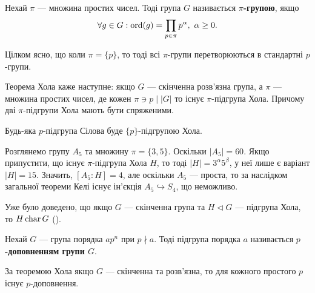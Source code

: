 \documentclass{math_library}
\begin{document}
\begin{definition}
Нехай $\pi$ --- множина простих чисел. Тоді група $G$ називається \textbf{$\pi$-групою}, якщо
\begin{align*}
\forall g \in G: \ord(g) = \displaystyle\prod_{p \in \pi} p^{\alpha},\ \alpha \geq 0.
\end{align*}
\end{definition}

\begin{remark}
Цілком ясно, що коли $\pi = \{p\}$, то тоді всі $\pi$-групи перетворюються в стандартні $p$-групи.
\end{remark}

\begin{remark}
Теорема Хола каже наступне: якщо $G$ --- скінченна розв'язна група, а $\pi$ --- множина простих чисел, де кожен $\pi \ni p \mid |G|$ то існує $\pi$-підгрупа Хола. Причому дві $\pi$-підгрупи Хола мають бути спряженими.
\end{remark}

\begin{remark}
Будь-яка $p$-підгрупа Сілова буде $\{p\}$-підгрупою Хола.
\end{remark}

\begin{example}
Розглянемо групу $A_5$ та множину $\pi = \{3,5\}$. Оскільки $|A_5| = 60$. Якщо припустити, що існує $\pi$-підгрупа Хола $H$, то тоді $|H| = 3^\alpha 5^\beta$, у неї лише є варіант $|H| = 15$. Значить, $[A_5:H] = 4$, але оскільки $A_5$ --- проста, то за наслідком загальної теореми Келі існує ін'єкція $A_5 \hookrightarrow S_4$, що неможливо.
\end{example}

\begin{remark}
Уже було доведено, що якщо $G$ --- скінченна група та $H \triangleleft G$ --- підгрупа Хола, то $H \operatorname{char} G$ ().
\end{remark}

\begin{definition}
Нехай $G$ --- група порядка $ap^n$ при $p \nmid a$. Тоді підгрупа порядка $a$ називається \textbf{$p$-доповненням групи $G$}.
\end{definition}

\begin{remark}
За теоремою Хола якщо $G$ --- скінченна та розв'язна, то для кожного простого $p$ існує $p$-доповнення.
\end{remark}
\end{document}
